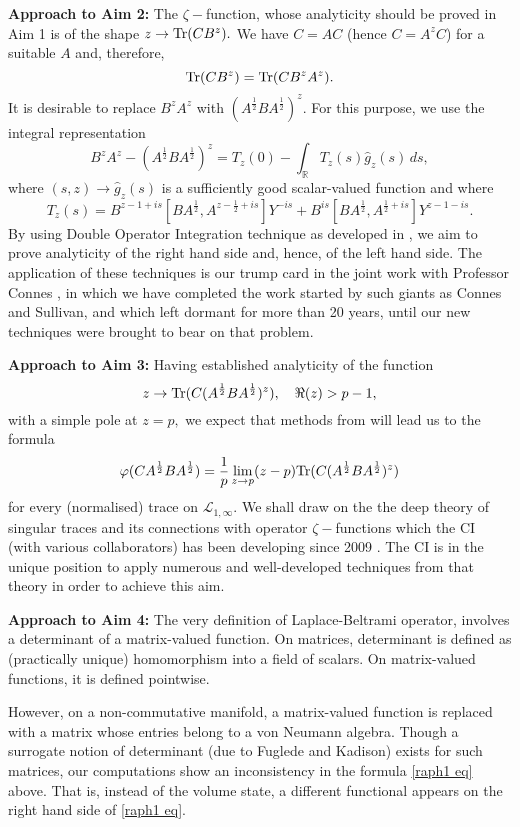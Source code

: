 \documentclass[12pt]{article}
\begin{document}
{\bf Approach to Aim 2:} The $\zeta-$function, whose analyticity should be proved in Aim 1 is of the shape $z\to {\rm Tr}(CB^z).$ We have $C=AC$ (hence $C=A^zC$) for a suitable $A$ and, therefore,
$${\rm Tr}(CB^z)={\rm Tr}(CB^zA^z).$$
It is desirable to replace $B^zA^z$ with $(A^{\frac12}BA^{\frac12})^z.$ For this purpose, we use the integral representation
$$B^zA^z-(A^{\frac{1}{2}}BA^{\frac{1}{2}})^z = T_z(0)-\int_{\mathbb{R}} T_z(s)\widehat{g}_z(s)\,ds,$$ 
where $(s,z)\to\widehat{g}_z(s)$ is a sufficiently good scalar-valued function and where
$$T_z(s)= B^{z-1+is}[BA^{\frac{1}{2}},A^{z-\frac{1}{2}+is}]Y^{-is}+B^{is}[BA^{\frac{1}{2}},A^{\frac{1}{2}+is}]Y^{z-1-is}.$$
By using Double Operator Integration technique as developed in \cite{PotapovSukochev}, we aim to prove analyticity of the right hand side and, hence, of the left hand side. The application of these techniques is our trump card in the joint work with Professor Connes \cite{Connes_team}, in which we have completed the work started by such giants as Connes and Sullivan, and which left dormant for more than 20 years, until our new techniques were brought to bear on that problem.


{\bf Approach to Aim 3:} Having established analyticity of the function
$$z\to {\rm Tr}(C(A^{\frac12}BA^{\frac12})^z),\quad \Re(z)>p-1,$$
with a simple pole at $z=p,$ we expect that methods from \cite{SUZ-indiana} will lead us to the formula
$$\varphi(CA^{\frac12}BA^{\frac12})=\frac1p\lim_{z\to p}(z-p){\rm Tr}(C(A^{\frac12}BA^{\frac12})^z)$$
for every (normalised) trace on $\mathcal{L}_{1,\infty}.$ We shall draw on the the deep theory of singular traces and its connections with operator $\zeta-$functions which the CI (with various collaborators) has been developing since 2009 \cite{book,SUZ-indiana}. The CI is in the unique position to apply numerous and well-developed techniques from that theory in order to achieve this aim.

{\bf Approach to Aim 4:} The very definition of Laplace-Beltrami operator, involves a determinant of a matrix-valued function. On matrices, determinant is defined as (practically unique) homomorphism into a field of scalars. On matrix-valued functions, it is defined pointwise.

However, on a non-commutative manifold, a matrix-valued function is replaced with a matrix whose entries belong to a von Neumann algebra. Though a surrogate notion of determinant (due to Fuglede and Kadison) exists for such matrices, our computations show an inconsistency in the formula \eqref{raph1 eq} above. That is, instead of the volume state, a different functional appears on the right hand side of \eqref{raph1 eq}.
\end{document}
